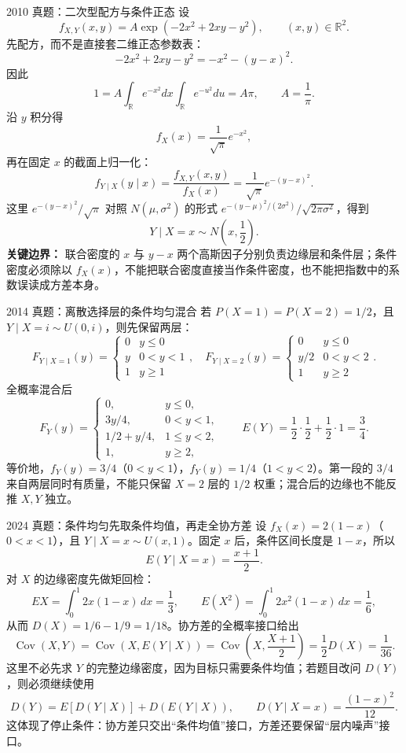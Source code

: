 \documentclass[11pt,a4paper]{ctexart}
\begin{document}
\begin{examplebox}{2010 真题：二次型配方与条件正态}
设
\[
f_{X,Y}(x,y)=A\exp(-2x^2+2xy-y^2),\qquad (x,y)\in\mathbb R^2.
\]
先配方，而不是直接套二维正态参数表：
\[
-2x^2+2xy-y^2=-x^2-(y-x)^2.
\]
因此
\[
1=A\int_{\mathbb R}e^{-x^2}dx\int_{\mathbb R}e^{-u^2}du=A\pi,
\qquad A=\frac1\pi.
\]
沿 $y$ 积分得
\[
f_X(x)=\frac1{\sqrt\pi}e^{-x^2},
\]
再在固定 $x$ 的截面上归一化：
\[
f_{Y\mid X}(y\mid x)=\frac{f_{X,Y}(x,y)}{f_X(x)}
 =\frac1{\sqrt\pi}e^{-(y-x)^2}.
\]
这里 $e^{-(y-x)^2}/\sqrt\pi$ 对照 $N(\mu,\sigma^2)$ 的形式
$e^{-(y-\mu)^2/(2\sigma^2)}/\sqrt{2\pi\sigma^2}$，得到
\[
Y\mid X=x\sim N\!\left(x,\frac12\right).
\]
\textbf{关键边界：} 联合密度的 $x$ 与 $y-x$ 两个高斯因子分别负责边缘层和条件层；条件密度必须除以 $f_X(x)$，不能把联合密度直接当作条件密度，也不能把指数中的系数误读成方差本身。
\end{examplebox}

\begin{examplebox}{2014 真题：离散选择层的条件均匀混合}
若 $P(X=1)=P(X=2)=1/2$，且 $Y\mid X=i\sim U(0,i)$，则先保留两层：
\[
F_{Y\mid X=1}(y)=\begin{cases}0&y\le0\\y&0<y<1\\1&y\ge1\end{cases},\quad
F_{Y\mid X=2}(y)=\begin{cases}0&y\le0\\y/2&0<y<2\\1&y\ge2\end{cases}.
\]
全概率混合后
\[
F_Y(y)=\begin{cases}
0,&y\le0,\\
3y/4,&0<y<1,\\
1/2+y/4,&1\le y<2,\\
1,&y\ge2,
\end{cases}
\qquad E(Y)=\frac12\cdot\frac12+\frac12\cdot1=\frac34.
\]
等价地，$f_Y(y)=3/4$（$0<y<1$），$f_Y(y)=1/4$（$1<y<2$）。第一段的 $3/4$ 来自两层同时有质量，不能只保留 $X=2$ 层的 $1/2$ 权重；混合后的边缘也不能反推 $X,Y$ 独立。
\end{examplebox}

\begin{examplebox}{2024 真题：条件均匀先取条件均值，再走全协方差}
设 $f_X(x)=2(1-x)$（$0<x<1$），且 $Y\mid X=x\sim U(x,1)$。固定 $x$ 后，条件区间长度是 $1-x$，所以
\[
E(Y\mid X=x)=\frac{x+1}{2}.
\]
对 $X$ 的边缘密度先做矩回检：
\[
EX=\int_0^1 2x(1-x)\,dx=\frac13,
\qquad
E(X^2)=\int_0^1 2x^2(1-x)\,dx=\frac16,
\]
从而 $D(X)=1/6-1/9=1/18$。协方差的全概率接口给出
\[
\operatorname{Cov}(X,Y)
=\operatorname{Cov}\!\left(X,E(Y\mid X)\right)
=\operatorname{Cov}\!\left(X,\frac{X+1}{2}\right)
=\frac12D(X)=\frac1{36}.
\]
这里不必先求 $Y$ 的完整边缘密度，因为目标只需要条件均值；若题目改问 $D(Y)$，则必须继续使用
\[
D(Y)=E[D(Y\mid X)]+D(E(Y\mid X)),
\qquad D(Y\mid X=x)=\frac{(1-x)^2}{12}.
\]
这体现了停止条件：协方差只交出“条件均值”接口，方差还要保留“层内噪声”接口。
\end{examplebox}
\end{document}
